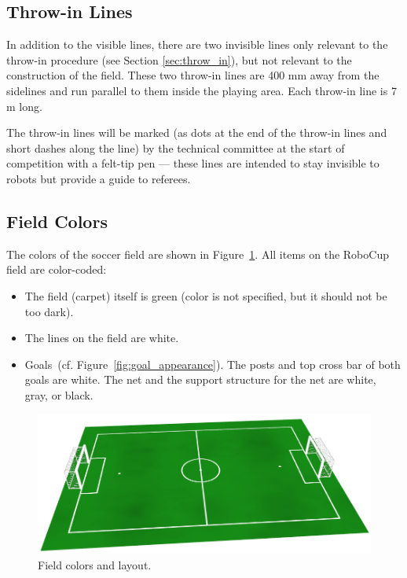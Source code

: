 \documentclass[12pt]{article}
\newcommand{\cf}{\mbox{cf.}\xspace}
\begin{document}
\subsection{Throw-in Lines}
\label{sec:field_lines}

In addition to the visible lines, there are two invisible lines only relevant to the throw-in procedure (see Section \ref{sec:throw_in}), but not relevant to the construction of the field. These two throw-in lines are 400 mm away from the sidelines and run parallel to them inside the playing area.  Each throw-in line is 7 m long.

The throw-in lines will be marked (as dots at the end of the throw-in lines and short dashes along the line) by the technical committee at the start of competition with a felt-tip pen --- these lines are intended to stay invisible to robots but provide a guide to referees.

\subsection{Field Colors}

The colors of the soccer field are shown in Figure~\ref{fig:field_color}. All items on the RoboCup field are color-coded:

\begin{itemize}

\item The field (carpet) itself is green (color is not specified, but it should not be too dark).

\item The lines on the field are white.

\item Goals~(\cf Figure~\ref{fig:goal_appearance}). The posts and top cross bar of both goals are white. The net and the support structure for the net are white, gray, or black.

\end{itemize}

\begin{figure}[t]
\centerline{\includegraphics[width=\columnwidth]{figs/emptyfield_2015.png}}
\caption{Field colors and layout.}
\label{fig:field_color}
\end{figure}
\end{document}

